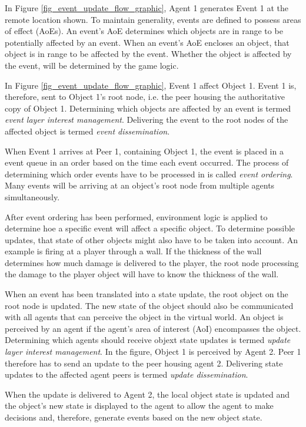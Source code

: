 In Figure \ref{fig_event_update_flow_graphic}, Agent 1 generates Event 1 at the remote location shown. To maintain generality, events are defined to possess areas of effect (AoEs). An event's AoE determines which objects are in range to be potentially affected by an event. When an event's AoE encloses an object, that object is in range to be affected by the event. Whether the object is affected by the event, will be determined by the game logic.

In Figure \ref{fig_event_update_flow_graphic}, Event 1 affect Object 1. Event 1 is, therefore, sent to Object 1's root node, i.e. the peer housing the authoritative copy of Object 1. Determining which objects are affected by an event is termed \emph{event layer interest management}. Delivering the event to the root nodes of the affected object is termed \emph{event dissemination}.

When Event 1 arrives at Peer 1, containing Object 1, the event is placed in a event queue in an order based on the time each event occurred. The process of determining which order events have to be processed in is called \emph{event ordering}. Many events will be arriving at an object's root node from multiple agents simultaneously.

After event ordering has been performed, environment logic is applied to determine hoe a specific event will affect a specific object. To determine possible updates, that state of other objects might also have to be taken into account. An example is firing at a player through a wall. If the thickness of the wall determines how much damage is delivered to the player, the root node processing the damage to the player object will have to know the thickness of the wall.

When an event has been translated into a state update, the root object on the root node is updated. The new state of the object should also be communicated with all agents that can perceive the object in the virtual world. An object is perceived by an agent if the agent's area of interest (AoI) encompasses the object. Determining which agents should receive objext state updates is termed \emph{update layer interest management}. In the figure, Object 1 is perceived by Agent 2. Peer 1 therefore has to send an update to the peer housing agent 2. Delivering state updates to the affected agent peers is termed \emph{update dissemination}.

When the update is delivered to Agent 2, the local object state is updated and the object's new state is displayed to the agent to allow the agent to make decisions and, therefore, generate events based on the new object state.

